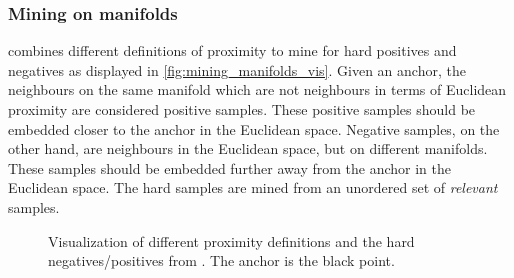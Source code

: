 \subsubsection{Mining on manifolds}\label{subsec:mining_manifolds} %


\citet{mining_manifolds_2018} combines different definitions of proximity to mine 
for hard positives and negatives as displayed in \autoref{fig:mining_manifolds_vis}.
Given an anchor, the neighbours on the same manifold which are not neighbours in terms of 
Euclidean proximity are considered positive samples.
These positive samples should be embedded closer to the anchor in the Euclidean space.
Negative samples, on the other hand, are neighbours in the Euclidean space, 
but on different manifolds.
These samples should be embedded further away from the anchor in the Euclidean space.
The hard samples are mined from an unordered set of \textit{relevant} samples.

\begin{figure}[h]%
    \centering
    \qquad
    \qquad
    \qquad

    \caption{Visualization of different proximity definitions and 
    the hard negatives/positives from \citet{mining_manifolds_2018}.
    The anchor is the black point.}%
    \label{fig:mining_manifolds_vis}%
\end{figure}

